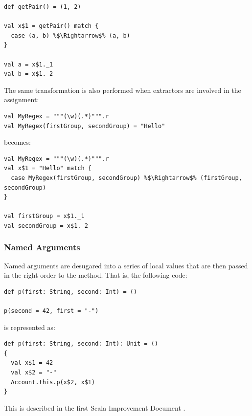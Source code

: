 \begin{lstlisting}
def getPair() = (1, 2)

val x$1 = getPair() match {
  case (a, b) %$\Rightarrow$% (a, b)
}

val a = x$1._1
val b = x$1._2
\end{lstlisting}

The same transformation is also performed when extractors are involved in the assignment:

\begin{lstlisting}
val MyRegex = """(\w)(.*)""".r
val MyRegex(firstGroup, secondGroup) = "Hello"
\end{lstlisting}

becomes:

\begin{lstlisting}
val MyRegex = """(\w)(.*)""".r
val x$1 = "Hello" match {
  case MyRegex(firstGroup, secondGroup) %$\Rightarrow$% (firstGroup, secondGroup)
}

val firstGroup = x$1._1
val secondGroup = x$1._2
\end{lstlisting}

\subsubsection*{Named Arguments}

Named arguments are desugared into a series of local values that are then passed in the right order to the method. That is, the following code:

\begin{lstlisting}
def p(first: String, second: Int) = ()

p(second = 42, first = "-")      
\end{lstlisting}

is represented as:

\begin{lstlisting}
def p(first: String, second: Int): Unit = ()
{
  val x$1 = 42
  val x$2 = "-"
  Account.this.p(x$2, x$1)
}
\end{lstlisting}

This is described in the first Scala Improvement Document \cite{SID1}.

\label{end-chapter:scala-ast}

